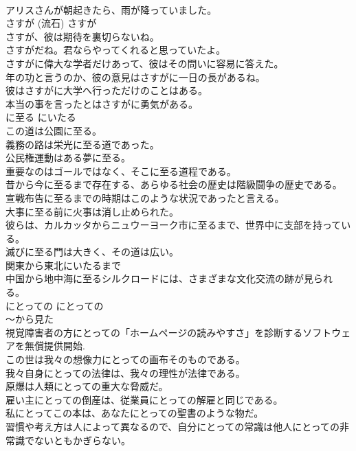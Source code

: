 \documentclass[8pt]{extreport}
\begin{document}
\begin{CJK}{UTF8}{min}
\\	アリスさんが朝起きたら、雨が降っていました。  
\\	さすが (流石)	さすが	
\\	さすが、彼は期待を裏切らないね。  
\\	さすがだね。君ならやってくれると思っていたよ。  
\\	さすがに偉大な学者だけあって、彼はその問いに容易に答えた。  
\\	年の功と言うのか、彼の意見はさすがに一日の長があるね。  
\\	彼はさすがに大学へ行っただけのことはある。  
\\	本当の事を言ったとはさすがに勇気がある。  
\\	に至る	にいたる	
\\	この道は公園に至る。  
\\	義務の路は栄光に至る道であった。   
\\	公民権運動はある夢に至る。   
\\	重要なのはゴールではなく、そこに至る道程である。   
\\	昔から今に至るまで存在する、あらゆる社会の歴史は階級闘争の歴史である。   
\\	宣戦布告に至るまでの時期はこのような状況であったと言える。   
\\	大事に至る前に火事は消し止められた。   
\\	彼らは、カルカッタからニュウーヨーク市に至るまで、世界中に支部を持っている。   
\\	滅びに至る門は大きく、その道は広い。   
\\	関東から東北にいたるまで  
\\	中国から地中海に至るシルクロードには、さまざまな文化交流の跡が見られる。  
\\	にとっての	にとっての	
\\	〜から見た	
\\	視覚障害者の方にとっての「ホームページの読みやすさ」を診断するソフトウェアを無償提供開始.  
\\	この世は我々の想像力にとっての画布そのものである。   
\\	我々自身にとっての法律は、我々の理性が法律である。   
\\	原爆は人類にとっての重大な脅威だ。   
\\	雇い主にとっての倒産は、従業員にとっての解雇と同じである。   
\\	私にとってこの本は、あなたにとっての聖書のような物だ。   
\\	習慣や考え方は人によって異なるので、自分にとっての常識は他人にとっての非常識でないともかぎらない。  

\end{CJK}
\end{document}

